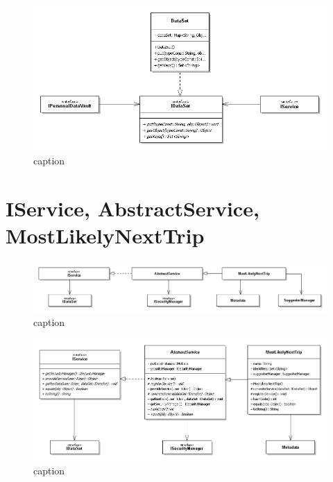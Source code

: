 \begin{figure} [h]
	\includegraphics[width=\linewidth]{pictures/IDataSet.png}
	\caption{caption}
	\label{fig:IDataSet}
\end{figure}

\section{IService, AbstractService, MostLikelyNextTrip}
\begin{figure} [h]
	\includegraphics[width=\linewidth]{pictures/Services-closed.png}
	\caption{caption}
	\label{fig:Services-closed}
\end{figure}

\begin{figure} [h]
	\includegraphics[width=\linewidth]{pictures/Services-open.png}
	\caption{caption}
	\label{fig:Services-open}
\end{figure}

